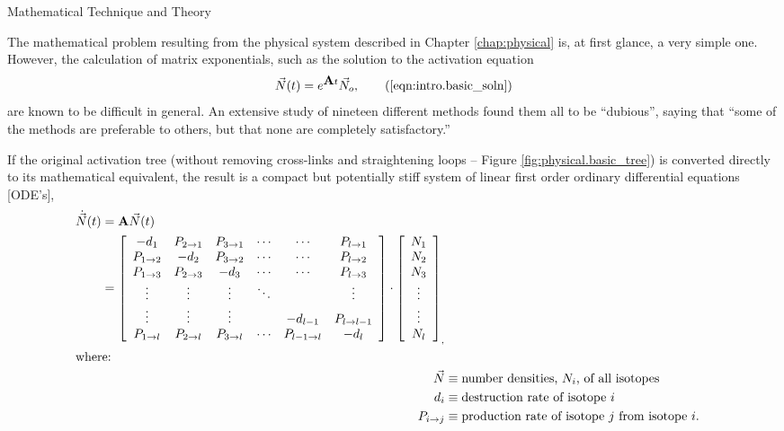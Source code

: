 
\begin{chapter}{Mathematical Technique and Theory\label{chap:math}}
  
  The mathematical problem resulting from the physical system
  described in Chapter \ref{chap:physical} is, at first glance, a very
  simple one.  However, the calculation of matrix exponentials, such
  as the solution to the activation equation
  \begin{equation}
    \vec{N}(t) = e^{\mat{A} t} \vec{N}_o,\tag{\ref{eqn:intro.basic_soln}}
  \end{equation}
  are known to be difficult in general.  An extensive study of
  nineteen different methods found them all to be ``dubious'', saying
  that ``some of the methods are preferable to others, but that none
  are completely satisfactory.''\cite{DUBIOUS}
  
  If the original activation tree (without removing cross-links and
  straightening loops -- Figure \ref{fig:physical.basic_tree}) is
  converted directly to its mathematical equivalent, the result is a
  compact but potentially stiff system of linear first order ordinary
  differential equations [ODE's],
  \begin{align}
    \begin{split}
      \dot{\vec{N}}(t) &= \mbox{$\mathbf{A}$}\vec{N}(t)\\
        &= \left [
          \begin{array}{cccccc}
            -d_1 & P_{2\rightarrow 1} & P_{3\rightarrow 1} & \cdots & \cdots & P_{l\rightarrow 1}\\
            P_{1\rightarrow 2} & -d_2 & P_{3\rightarrow 2} & \cdots & \cdots & P_{l\rightarrow 2}\\
            P_{1\rightarrow 3} & P_{2\rightarrow 3} & -d_3 & \cdots & \cdots & P_{l\rightarrow 3}\\
            \vdots & \vdots & \vdots & \ddots &  & \vdots\\
            \vdots & \vdots & \vdots & & -d_{l-1} & P_{l\rightarrow l-1}\\
            P_{1\rightarrow l} & P_{2\rightarrow l} & P_{3\rightarrow l} & \cdots & P_{l-1\rightarrow l} & -d_l
          \end{array} \right ] \cdot \left [
          \begin{array}{c}
            N_1 \\ N_2 \\ N_3 \\ \vdots \\ \vdots \\ N_l
          \end{array} \right ]_,
    \end{split}\label{eq:math.intro.explicit}\\
    \intertext{where:}
    \vec{N} &\equiv \text{number densities, $N_i$, of all isotopes}\notag \\
    d_i &\equiv \text{destruction rate of isotope $i$}\notag \\
    P_{i\rightarrow j} &\equiv \text{production rate of isotope $j$ from isotope $i$.}\notag
  \end{align}
  

\end{chapter}
